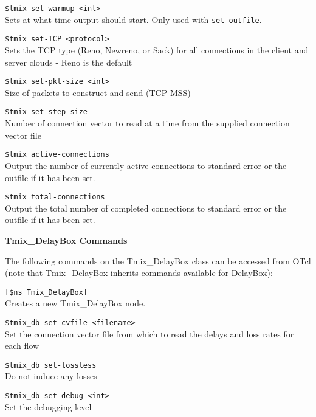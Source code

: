 {\tt \$tmix set-warmup <int>}\\
Sets at what time output should start.  Only used with {\tt set outfile}.

{\tt \$tmix set-TCP <protocol>}\\
Sets the TCP type (Reno, Newreno, or Sack) for all connections in the
client and server clouds - Reno is the default

{\tt \$tmix set-pkt-size <int>}\\
Size of packets to construct and send (TCP MSS)

{\tt \$tmix set-step-size}\\
Number of connection vector to read at a time from the supplied connection vector file

{\tt \$tmix active-connections}\\
Output the number of currently active connections to standard error or the
outfile if it has been set.

{\tt \$tmix total-connections}\\
Output the total number of completed connections to standard error or
the outfile if it has been set.


{\bf Tmix\_DelayBox Commands}

The following commands on the Tmix\_DelayBox class can be accessed
from OTcl (note that Tmix\_DelayBox inherits commands available for DelayBox):

{\tt [\$ns Tmix\_DelayBox]}\\
Creates a new Tmix\_DelayBox node.

{\tt \$tmix\_db set-cvfile <filename>}\\
Set the connection vector file from which to read the delays and loss rates for
each flow

{\tt \$tmix\_db set-lossless}\\
Do not induce any losses 

{\tt \$tmix\_db set-debug <int>}\\
Set the debugging level

%
